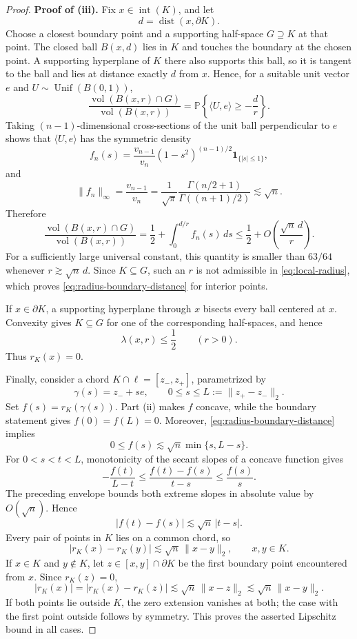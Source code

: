\documentclass[11pt]{article}
\theoremstyle{definition}
\theoremstyle{remark}
\newcommand{\Prb}{\mathbb P}
\newcommand{\vol}{\operatorname{vol}}
\newcommand{\one}{\mathbf 1}
\newcommand{\Unif}{\operatorname{Unif}}
\newcommand{\rK}{r_K}
\begin{document}
\begin{proof}
\textbf{Proof of \textup{(iii)}.} Fix
\(x\in\operatorname{int}(K)\), and let
\[
 d=\operatorname{dist}(x,\partial K).
\]
Choose a closest boundary point and a supporting half-space
\(G\supseteq K\) at that point.  The closed ball $B(x,d)$ lies in $K$ and
touches the boundary at the chosen point.  A supporting hyperplane of $K$
there also supports this ball, so it is tangent to the ball and lies at
distance exactly $d$ from $x$.  Hence, for a suitable unit vector \(e\) and
\(U\sim\Unif(B(0,1))\),
\[
 \frac{\vol(B(x,r)\cap G)}{\vol(B(x,r))}
 =
 \Prb\left\{\langle U,e\rangle\ge-\frac dr\right\}.
\]
Taking $(n-1)$-dimensional cross-sections of the unit ball perpendicular to
$e$ shows that \(\langle U,e\rangle\) has the symmetric density
\[
 f_n(s)
 =
 \frac{v_{n-1}}{v_n}
 (1-s^2)^{(n-1)/2}\one_{\{|s|\le1\}},
\]
and
\[
 \|f_n\|_\infty
 =
 \frac{v_{n-1}}{v_n}
 =\frac1{\sqrt\pi}
   \frac{\Gamma(n/2+1)}{\Gamma((n+1)/2)}
 \lesssim\sqrt n.
\]
Therefore
\[
 \frac{\vol(B(x,r)\cap G)}{\vol(B(x,r))}
 =
 \frac12+\int_0^{d/r}f_n(s)\,ds
 \le
 \frac12+O\left(\frac{\sqrt n\,d}{r}\right).
\]
For a sufficiently large universal constant, this quantity is smaller than
\(63/64\) whenever \(r\gtrsim\sqrt n\,d\).  Since \(K\subseteq G\), such
an \(r\) is not admissible in \eqref{eq:local-radius}, which proves
\eqref{eq:radius-boundary-distance} for interior points.

If \(x\in\partial K\), a supporting hyperplane through \(x\) bisects every
ball centered at \(x\).  Convexity gives \(K\subseteq G\) for one of the
corresponding half-spaces, and hence
\[
 \lambda(x,r)\le\frac12
 \qquad(r>0).
\]
Thus \(\rK(x)=0\).

Finally, consider a chord \(K\cap\ell=[z_-,z_+]\), parametrized by
\[
 \gamma(s)=z_-+se,
 \qquad
 0\le s\le L:=\|z_+-z_-\|_2.
\]
Set \(f(s)=\rK(\gamma(s))\).  Part \textup{(ii)} makes \(f\) concave,
while the boundary statement gives \(f(0)=f(L)=0\).  Moreover,
\eqref{eq:radius-boundary-distance} implies
\[
 0\le f(s)\lesssim\sqrt n\min\{s,L-s\}.
\]
For \(0<s<t<L\), monotonicity of the secant slopes of a concave function
gives
\[
 -\frac{f(t)}{L-t}
 \le
 \frac{f(t)-f(s)}{t-s}
 \le
 \frac{f(s)}s.
\]
The preceding envelope bounds both extreme slopes in absolute value by
\(O(\sqrt n)\).  Hence
\[
 |f(t)-f(s)|\lesssim\sqrt n\,|t-s|.
\]
Every pair of points in \(K\) lies on a common chord, so
\[
 |\rK(x)-\rK(y)|
 \lesssim
 \sqrt n\,\|x-y\|_2,
 \qquad x,y\in K.
\]
If \(x\in K\) and \(y\notin K\), let
\(z\in[x,y]\cap\partial K\) be the first boundary point encountered from
\(x\).  Since \(\rK(z)=0\),
\[
 |\rK(x)|
 =|\rK(x)-\rK(z)|
 \lesssim\sqrt n\,\|x-z\|_2
 \lesssim\sqrt n\,\|x-y\|_2.
\]
If both points lie outside $K$, the zero extension vanishes at both; the
case with the first point outside follows by symmetry.  This proves the
asserted Lipschitz bound in all cases.


\end{proof}
\end{document}
